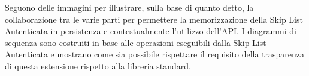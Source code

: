 

	Seguono delle immagini per illustrare, sulla base di quanto detto, la collaborazione tra le varie parti per permettere la memorizzazione della Skip List Autenticata in persistenza e contestualmente l'utilizzo dell'API. I diagrammi di sequenza sono costruiti in base alle operazioni eseguibili dalla Skip List Autenticata e mostrano come sia possibile rispettare il requisito della trasparenza di questa estensione rispetto alla libreria standard.







